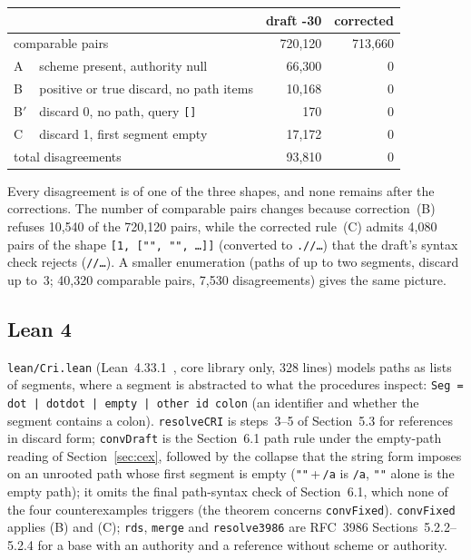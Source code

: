 \documentclass[11pt,a4paper]{article}
\theoremstyle{remark}
\newcommand{\lean}[1]{\texttt{#1}}
\newcommand{\cri}[1]{\texttt{#1}}
\newcommand{\uri}[1]{\texttt{#1}}
\begin{document}
\begin{center}\small
\begin{tabular}{llrr}
\toprule
 & & draft -30 & corrected\\
\midrule
\multicolumn{2}{l}{comparable pairs} & 720{,}120 & 713{,}660\\
A & scheme present, authority null & 66{,}300 & 0\\
B & positive or true discard, no path items & 10{,}168 & 0\\
B$'$ & discard 0, no path, query \cri{[]} & 170 & 0\\
C & discard 1, first segment empty & 17{,}172 & 0\\
\multicolumn{2}{l}{total disagreements} & 93{,}810 & 0\\
\bottomrule
\end{tabular}
\end{center}
\noindent Every disagreement is of one of the three shapes, and none remains after the corrections.
The number of comparable pairs changes because correction~(B) refuses 10{,}540 of the 720{,}120 pairs,
while the corrected rule~(C) admits 4{,}080 pairs of the shape \cri{[1, ["", "", \ldots]]} (converted
to \uri{.//\ldots}) that the draft's syntax check rejects (\uri{//\ldots}). A smaller enumeration (paths of up to two segments, discard up to~3; 40{,}320 comparable pairs, 7{,}530
disagreements) gives the same picture.

\subsection{Lean 4}
\lean{lean/Cri.lean} (Lean~4.33.1~\cite{lean4}, core library only, 328 lines) models paths as lists of
segments, where a segment is abstracted to what the procedures inspect: \lean{Seg = dot | dotdot | empty
| other id colon} (an identifier and whether the segment contains a colon). \lean{resolveCRI} is
steps~3--5 of Section~5.3 for references in discard form; \lean{convDraft} is the Section~6.1 path rule
under the empty-path reading of Section~\ref{sec:cex}, followed by the collapse that the string form
imposes on an unrooted path whose first segment is empty (\uri{""}\,+\,\uri{/a} is \uri{/a}, \uri{""}
alone is the empty path); it omits the final path-syntax check of Section~6.1, which none of the four
counterexamples triggers (the theorem concerns \lean{convFixed}). \lean{convFixed}
applies (B) and (C); \lean{rds}, \lean{merge} and \lean{resolve3986} are RFC~3986 Sections~5.2.2--5.2.4
for a base with an authority and a reference without scheme or authority.
\end{document}
